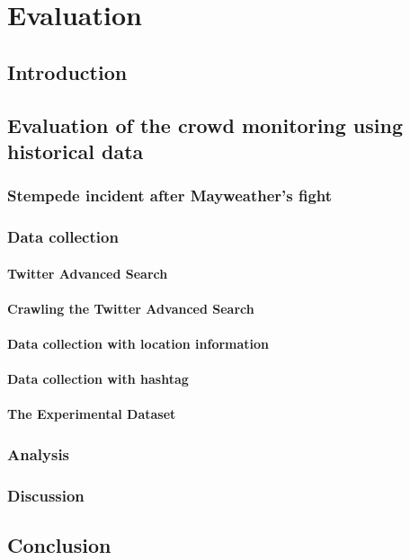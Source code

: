 \chapter{Evaluation}

\ifpdf
    \graphicspath{{Chapter5/Figs/Raster/}{Chapter5/Figs/PDF/}{Chapter5/Figs/}}
\else
    \graphicspath{{Chapter5/Figs/Vector/}{Chapter5/Figs/}}
\fi

\section{Introduction}

\section{Evaluation of the crowd monitoring using historical data}

\subsection{Stempede incident after Mayweather's fight}

\subsection{Data collection}

\subsubsection{Twitter Advanced Search}

\subsubsection{Crawling the Twitter Advanced Search}

\subsubsection{Data collection with location information}

\subsubsection{Data collection with hashtag}

\subsubsection{The Experimental Dataset}

\subsection{Analysis}

\subsection{Discussion}

\section{Conclusion}
